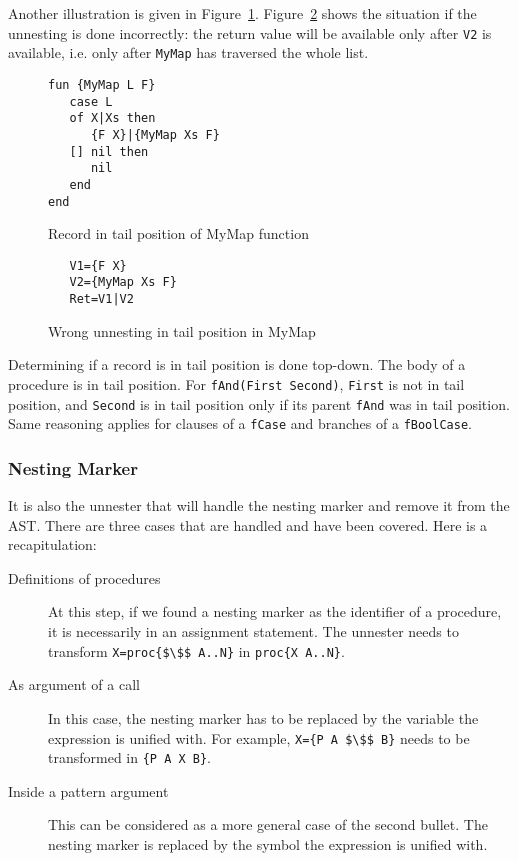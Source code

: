 \documentclass[a4paper]{memoir}
\begin{document}
Another illustration is given in Figure~\ref{fig:unnester:mymap}. Figure~\ref{fig:unnester:wrongmymap} shows
the situation if the unnesting is done incorrectly: the return value
will be available only after \lstinline!V2! is available, i.e. only after
\lstinline!MyMap! has
traversed the whole list.

\begin{figure}[h]
\begin{lstlisting}
fun {MyMap L F}
   case L
   of X|Xs then
      {F X}|{MyMap Xs F}
   [] nil then
      nil
   end
end
\end{lstlisting}
\caption{Record in tail position of MyMap function}
\label{fig:unnester:mymap}
\end{figure}


\begin{figure}[h]
\begin{lstlisting}
   V1={F X}
   V2={MyMap Xs F}
   Ret=V1|V2
\end{lstlisting}
\caption{Wrong unnesting in tail position in MyMap}
\label{fig:unnester:wrongmymap}
\end{figure}

Determining if a record is in tail position is done top-down.
The body of a procedure is in tail position. For \lstinline!fAnd(First Second)!,
\lstinline!First! is not in tail position, and \lstinline!Second! is in tail
position only if its parent \lstinline!fAnd! was in tail position.
Same reasoning applies for clauses of a \lstinline!fCase! and branches of a
\lstinline!fBoolCase!.



\subsubsection{Nesting Marker}\label{sec:arch:unnester:nestingmarker}
It is also the unnester that will handle the nesting marker and remove it from
the AST. There are three cases that are handled and have been covered. Here is a
recapitulation:
\begin{description}
  \item[Definitions of procedures] At this step, if we found a nesting marker as the identifier of a procedure, it is necessarily in an assignment statement. The unnester needs to transform \lstinline[mathescape]!X=proc{$\$$ A..N}! in \lstinline!proc{X A..N}!.
  \item[As argument of a call] In this case, the nesting marker has to be
    replaced by the variable the expression is unified with. For example, \lstinline[mathescape]!X={P A $\$$ B}! needs to be transformed in  \lstinline!{P A X B}!. 
  \item[Inside a pattern argument] This can be considered as a more general case
    of the second bullet. The nesting marker is replaced by the symbol the
    expression is unified with.
\end{description}
\end{document}

